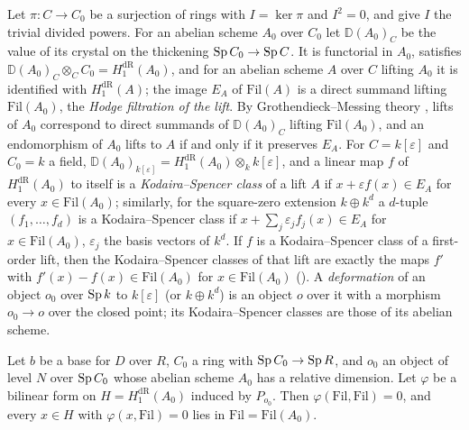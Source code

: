 Let $\pi:C\to C_0$ be a surjection of rings with $I=\ker\pi$ and $I^2=0$, and give $I$ the trivial divided powers. For an abelian scheme $A_0$
over $C_0$ let $\mathbb D(A_0)_C$ be the value of its crystal on the thickening $\operatorname{Sp} C_0\to\operatorname{Sp} C$. It is functorial in $A_0$, satisfies
$\mathbb D(A_0)_C\otimes_CC_0=H^{\mathrm{dR}}_1(A_0)$, and for an abelian scheme $A$ over $C$ lifting $A_0$ it is identified with $H^{\mathrm{dR}}_1(A)$;
the image $E_A$ of $\mathrm{Fil}(A)$ is a direct summand lifting $\mathrm{Fil}(A_0)$, the \emph{Hodge filtration of the lift}. By
Grothendieck--Messing theory \cite{Messing1972}, lifts of $A_0$ correspond to direct summands of $\mathbb D(A_0)_C$ lifting $\mathrm{Fil}(A_0)$, and an
endomorphism of $A_0$ lifts to $A$ if and only if it preserves $E_A$. For $C=k[\varepsilon]$ and $C_0=k$ a field, $\mathbb D(A_0)_{k[\varepsilon]}=
H^{\mathrm{dR}}_1(A_0)\otimes_kk[\varepsilon]$, and a linear map $f$ of $H^{\mathrm{dR}}_1(A_0)$ to itself is a \emph{Kodaira--Spencer class} of a lift $A$ if
$x+\varepsilon f(x)\in E_A$ for every $x\in\mathrm{Fil}(A_0)$; similarly, for the square-zero extension $k\oplus k^d$ a $d$-tuple $(f_1,\dots,f_d)$ is a
Kodaira--Spencer class if $x+\sum_j\varepsilon_jf_j(x)\in E_A$ for $x\in\mathrm{Fil}(A_0)$, $\varepsilon_j$ the basis vectors of $k^d$. If $f$ is a
Kodaira--Spencer class of a first-order lift, then the Kodaira--Spencer classes of that lift are exactly the maps $f'$ with
$f'(x)-f(x)\in\mathrm{Fil}(A_0)$ for $x\in\mathrm{Fil}(A_0)$ (). A \emph{deformation}
of an object $o_0$ over $\operatorname{Sp} k$ to $k[\varepsilon]$ (or $k\oplus k^d$) is an object $o$ over it with a morphism $o_0\to o$ over the closed point;
its Kodaira--Spencer classes are those of its abelian scheme.

\begin{proposition}\label{pf:ks1:prop-fillagr}
Let $b$ be a base for $D$ over $R$, $C_0$ a ring with $\operatorname{Sp} C_0\to\operatorname{Sp} R$, and $o_0$ an object of level $N$ over $\operatorname{Sp} C_0$ whose abelian
scheme $A_0$ has a relative dimension. Let $\varphi$ be a bilinear form on $H=H^{\mathrm{dR}}_1(A_0)$ induced by $P_{o_0}$. Then
$\varphi(\mathrm{Fil},\mathrm{Fil})=0$, and every $x\in H$ with $\varphi(x,\mathrm{Fil})=0$ lies in $\mathrm{Fil}=\mathrm{Fil}(A_0)$.
\end{proposition}

